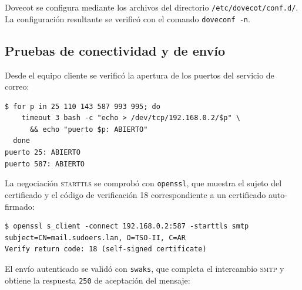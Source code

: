 Dovecot se configura mediante los archivos del directorio
\texttt{/etc/dovecot/conf.d/}. La configuraci\'on resultante se verificó con
el comando \texttt{doveconf -n}.


\subsection{Pruebas de conectividad y de env\'io}

Desde el equipo cliente se verific\'o la apertura de los puertos del
servicio de correo:

\begin{lstlisting}[style=terminal]
$ for p in 25 110 143 587 993 995; do
    timeout 3 bash -c "echo > /dev/tcp/192.168.0.2/$p" \
      && echo "puerto $p: ABIERTO"
  done
puerto 25: ABIERTO
puerto 587: ABIERTO
\end{lstlisting}


La negociaci\'on \textsc{starttls} se comprob\'o con \texttt{openssl},
que muestra el sujeto del certificado y el c\'odigo de verificaci\'on 18
correspondiente a un certificado auto-firmado:

\begin{lstlisting}[style=terminal]
$ openssl s_client -connect 192.168.0.2:587 -starttls smtp
subject=CN=mail.sudoers.lan, O=TSO-II, C=AR
Verify return code: 18 (self-signed certificate)
\end{lstlisting}


El env\'io autenticado se valid\'o con \texttt{swaks}, que completa el
intercambio \textsc{smtp} y obtiene la respuesta \texttt{250} de aceptaci\'on
del mensaje:

